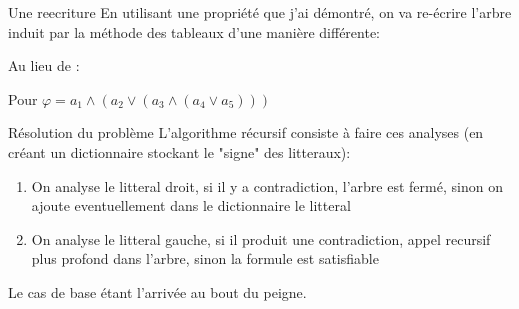 \documentclass[]{beamer}
\begin{document}
\begin{frame}{Une reecriture}
    En utilisant une propriété que j'ai démontré, on va re-écrire l'arbre induit par la méthode des tableaux d'une manière différente:

    Au lieu de :

    Pour $\varphi = a_1\land(a_2\lor(a_3\land(a_4\lor a_5)))$
\end{frame}

\begin{frame}{Résolution du problème}
    L'algorithme récursif consiste à faire ces analyses (en créant un dictionnaire stockant le "signe" des litteraux):
    \begin{enumerate}
        \item On analyse le litteral droit, si il y a contradiction, l'arbre est fermé, sinon on ajoute eventuellement dans le dictionnaire le litteral
        \item On analyse le litteral gauche, si il produit une contradiction, appel recursif plus profond dans l'arbre, sinon la formule est satisfiable
    \end{enumerate}
    Le cas de base étant l'arrivée au bout du peigne.
\end{frame}
\end{document}
